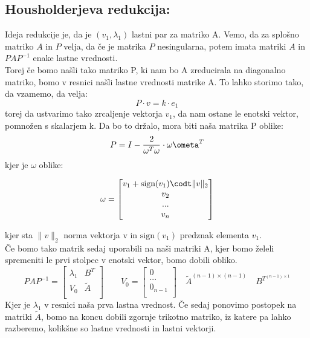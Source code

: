 \documentclass{article}
\begin{document}
\subsection{Housholderjeva redukcija:}
Ideja redukcije je, da je $(v_1,\lambda_1)$ lastni par za matriko A. Vemo, da za splošno matriko $A$ in $P$ velja, da če je matrika $P$ nesingularna, potem imata matriki $A$ in $PAP^{-1}$ enake lastne vrednosti. \\
Torej če bomo našli tako matriko P, ki nam bo A zreducirala na diagonalno matriko, bomo v resnici našli lastne vrednosti matrike A. To lahko storimo tako, da vzamemo, da velja: 
\begin{equation}
    P\cdot v=k \cdot e_1
\end{equation}
torej da ustvarimo tako zrcaljenje vektorja $v_1$, da nam ostane le enotski vektor, pomnožen s skalarjem k.
Da bo to držalo, mora biti naša matrika P oblike:
\begin{equation*}
    P= I- \frac{2}{\omega^T \omega} \cdot \omega \ometa^T
\end{equation*}
kjer je $\omega$ oblike: 
\begin{center}
\begin{equation*}
\omega=
\begin{bmatrix}
 v_1 + \mathrm{sign}(v_1)\codt \| v\|_2  \\
v_2 \\
...\\
v_n\\
\end{bmatrix}
\end{equation*}
\end{center}
kjer sta $\| v\|_2$ norma vektorja v in $\mathrm{sign}(v_1)$ predznak elementa $v_1$. \\
\midskip
Če bomo tako matrik sedaj uporabili na naši matriki A, kjer bomo želeli spremeniti le prvi stolpec v enotski vektor, bomo dobili obliko.
\begin{equation*}
PAP^{-1}= 
\begin{bmatrix}
 \lambda_1 & B^T \\
 V_0 & \tilde{A} \\ 
\end{bmatrix}
\qquad V_0 =\begin{bmatrix}
 0 \\
 ... \\
 0_{n-1} \\
\end{bmatrix}
\quad \tilde{A}^{(n-1) \times (n-1)}
\quad B^{T}^{(n-1) \times 1}
\end{equation*}
Kjer je $\lambda_1$ v resnici naša prva lastna vrednost. Če sedaj ponovimo postopek na matriki $\tilde{A}$, bomo na koncu dobili zgornje trikotno matriko, iz katere pa lahko razberemo, kolikšne so lastne vrednosti in lastni vektorji.
\end{document}
